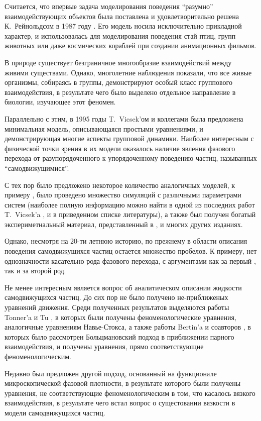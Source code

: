 
Считается, что впервые задача моделирования поведения ``разумно'' взаимодействующих объектов была поставлена и удовлетворительно решена К.~Рейнольдсом в 1987 году \cite{reynolds1987}. Его модель носила исключительно прикладной характер, и использовалась для моделирования поведения стай птиц, групп животных или даже космических кораблей при создании анимационных фильмов.

В природе существует безграничное многообразие взаимодействий между живими существами. Однако, многолетние наблюдения показали, что все живые организмы, собираясь в группы, демонстрируют особый класс группового взаимодействия, в результате чего было выделено отдельное направление в биологии, изучающее этот феномен.

Параллельно с этим, в 1995 годы T.~Vicsek'ом и коллегами \cite{vicsek1995} была предложена минимальная модель, описывающаяся простыми уравнениями, и демонстрирующая многие аспекты групповой динамики. Наиболее интересным с физической точки зрения в их модели оказалось наличие явления фазового перехода от разупорядоченного к упорядоченному поведению частиц, называнных ``самодвижущимися''.

С тех пор было предложено некоторое количество аналогичных моделей, к примеру \cite{gregoire2004,schubring2013,kuemmel2013,huepe2008,chate2008,tu2000}, было проведено множество симуляций с различными параметрами систем (наиболее полную информацию можно найти в одной из последних работ T.~Vicsek'a \cite{vicsek2012}, и в приведенном списке литературы), а также был получен богатый экспериметнальный материал, представленный в \cite{keller1971,chowdhury2006,czirok1999,csahok1997,buhl2006,ballerini2008,selous1931,dellariccia2008,biro2006,major1978,cambui2012,makris2006,parrish1997,sinclair1977}, и многих других изданиях.

Однако, несмотря на 20-ти летнюю историю, по прежнему в области описания поведения самодвижущихся частиц остается множество пробелов. К примеру, нет однозначности касательно рода фазового перехода, с аргументами как за первый \cite{gregoire2004,aldana2009}, так и за второй \cite{vicsek1995,czirok1999,huepe2008} род.

Не менее интересным является вопрос об аналитическом описании жидкости самодвижущихся частиц. До сих пор не было получено не-приближеных уравнений движения. Среди полученных результатов выделяются работы Tonner'a и Tu \cite{toner1995,tu2000}, в которых были получены феноменологические уравнения, аналогичные уравнениям Навье-Стокса, а также работы Bertin'a и соавторов \cite{bertin2006}, в которых было рассмотрен Больцмановский подход в приближении парного взаимодействия, и получены уравнения, прямо соответствующие феноменологическим.

Недавно был предложен другой подход, основанный на функционале микроскопической фазовой плотности, в результате которого были получены уравнения, не соответствующие феноменологическим в том, что касалось вязкого взаимодействия, в результате чего встал вопрос о сущестовании вязкости в модели самодвижущихся частиц.